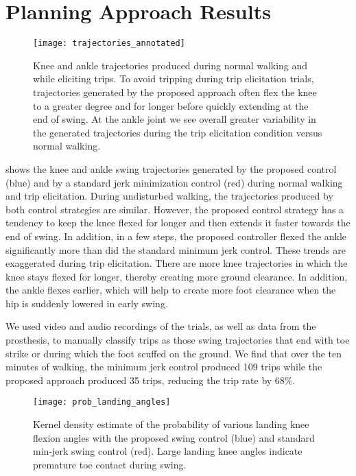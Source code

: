 \section{Planning Approach Results}

\begin{figure}[t]
    \centering
    \texttt{[image: trajectories\_annotated]}
    \caption{Knee and ankle trajectories produced during normal walking and
    while eliciting trips. To avoid tripping during trip elicitation trials,
    trajectories generated by the proposed approach often flex the knee to a
    greater degree and for longer before quickly extending at the end of swing.
    At the ankle joint we see overall greater variability in the generated
    trajectories during the trip elicitation condition versus normal walking.}
    \label{fig:trajectories}
\end{figure}

 shows the knee and ankle swing trajectories generated by
the proposed control (blue) and by a standard jerk minimization control (red)
during normal walking and trip elicitation. During undisturbed walking, the
trajectories produced by both control strategies are similar. However, the
proposed control strategy has a tendency to keep the knee flexed for longer and
then extends it faster towards the end of swing. In addition, in a few steps,
the proposed controller flexed the ankle significantly more than did the
standard minimum jerk control.  These trends are exaggerated during trip
elicitation. There are more knee trajectories in which the knee stays flexed for
longer, thereby creating more ground clearance. In addition, the ankle flexes
earlier, which will help to create more foot clearance when the hip is suddenly
lowered in early swing. 

We used video and audio recordings of the trials, as well as data from the
prosthesis, to manually classify trips as those swing trajectories that end with
toe strike or during which the foot scuffed on the ground. We find that over the
ten minutes of walking, the minimum jerk control produced 109 trips while the
proposed approach produced 35 trips, reducing the trip rate by 68\%.

\begin{figure}[t]
    \centering
    \texttt{[image: prob\_landing\_angles]}
    \caption{Kernel density estimate of the probability of various landing knee
    flexion angles with the proposed swing control (blue) and standard min-jerk
    swing control (red). Large landing knee angles indicate premature toe
    contact during swing.}
    \label{fig:p_landing_angle}
\end{figure}

